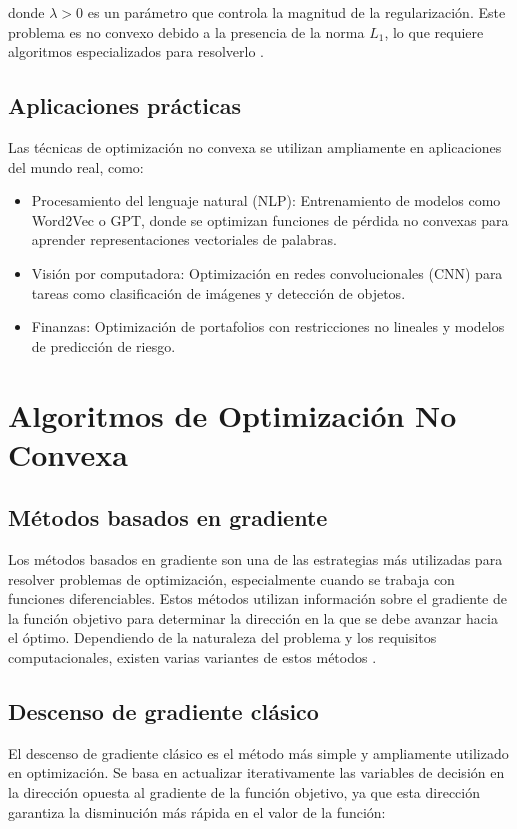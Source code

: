 \begin{itemize}
	donde \(\lambda > 0\) es un parámetro que controla la magnitud de la regularización. Este problema es no convexo debido a la presencia de la norma \(L_1\), lo que requiere algoritmos especializados para resolverlo \cite{tibshirani1996regression}.
	
	\subsection{Aplicaciones prácticas}
	
	Las técnicas de optimización no convexa se utilizan ampliamente en aplicaciones del mundo real, como:
	\begin{itemize}
		\item Procesamiento del lenguaje natural (NLP): Entrenamiento de modelos como Word2Vec o GPT, donde se optimizan funciones de pérdida no convexas para aprender representaciones vectoriales de palabras.
		\item Visión por computadora: Optimización en redes convolucionales (CNN) para tareas como clasificación de imágenes y detección de objetos.
		\item Finanzas: Optimización de portafolios con restricciones no lineales y modelos de predicción de riesgo.
\end{itemize}
\section{Algoritmos de Optimización No Convexa}
	
\subsection{Métodos basados en gradiente}
		
		Los métodos basados en gradiente son una de las estrategias más utilizadas para resolver problemas de optimización, especialmente cuando se trabaja con funciones diferenciables. Estos métodos utilizan información sobre el gradiente de la función objetivo para determinar la dirección en la que se debe avanzar hacia el óptimo. Dependiendo de la naturaleza del problema y los requisitos computacionales, existen varias variantes de estos métodos \cite{nocedal1999optimization}.
		
\subsection{Descenso de gradiente clásico}
		
		El descenso de gradiente clásico es el método más simple y ampliamente utilizado en optimización. Se basa en actualizar iterativamente las variables de decisión en la dirección opuesta al gradiente de la función objetivo, ya que esta dirección garantiza la disminución más rápida en el valor de la función:
		

\end{itemize}
